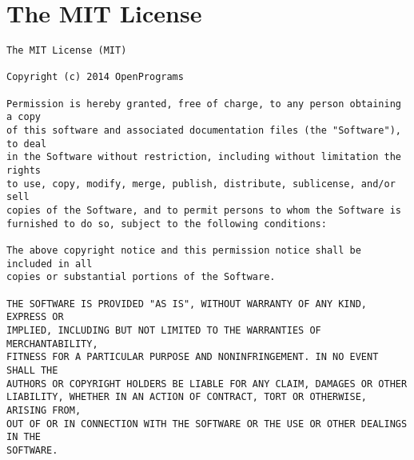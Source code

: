\documentclass[]{report}
\begin{document}
\chapter{The MIT License}\label{mit}
\begin{verbatim}
The MIT License (MIT)

Copyright (c) 2014 OpenPrograms

Permission is hereby granted, free of charge, to any person obtaining a copy
of this software and associated documentation files (the "Software"), to deal
in the Software without restriction, including without limitation the rights
to use, copy, modify, merge, publish, distribute, sublicense, and/or sell
copies of the Software, and to permit persons to whom the Software is
furnished to do so, subject to the following conditions:

The above copyright notice and this permission notice shall be included in all
copies or substantial portions of the Software.

THE SOFTWARE IS PROVIDED "AS IS", WITHOUT WARRANTY OF ANY KIND, EXPRESS OR
IMPLIED, INCLUDING BUT NOT LIMITED TO THE WARRANTIES OF MERCHANTABILITY,
FITNESS FOR A PARTICULAR PURPOSE AND NONINFRINGEMENT. IN NO EVENT SHALL THE
AUTHORS OR COPYRIGHT HOLDERS BE LIABLE FOR ANY CLAIM, DAMAGES OR OTHER
LIABILITY, WHETHER IN AN ACTION OF CONTRACT, TORT OR OTHERWISE, ARISING FROM,
OUT OF OR IN CONNECTION WITH THE SOFTWARE OR THE USE OR OTHER DEALINGS IN THE
SOFTWARE.
\end{verbatim}
\end{document}

